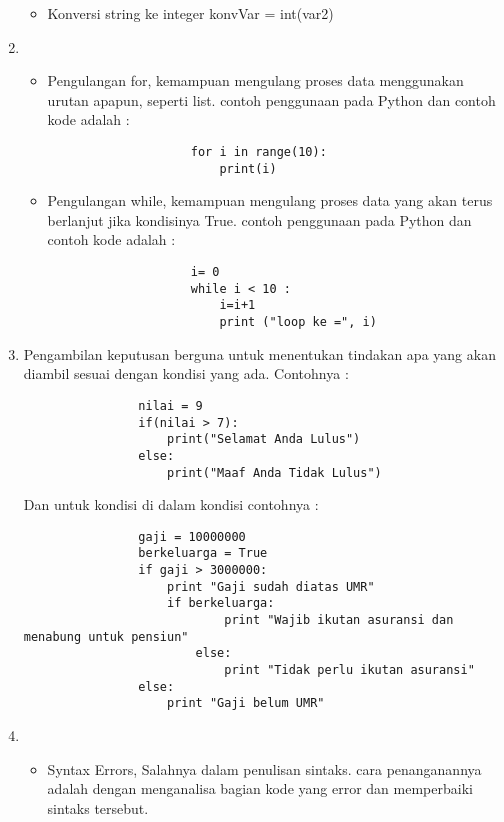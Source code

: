 \begin{enumerate}
\begin{itemize}
					\item Konversi string ke integer
					konvVar = int(var2)
				\end{itemize}

			\item \begin{itemize}
				\item Pengulangan for, kemampuan mengulang proses data menggunakan urutan apapun, seperti list.
				contoh penggunaan pada Python dan contoh kode adalah :

					\begin{verbatim}
					for i in range(10):
						print(i)
					\end{verbatim}
					
				\item Pengulangan while, kemampuan mengulang proses data yang akan terus berlanjut jika kondisinya True.
				contoh penggunaan pada Python dan contoh kode adalah :
					\begin{verbatim}
					i= 0
					while i < 10 :
						i=i+1
						print ("loop ke =", i)
					\end{verbatim}
				\end{itemize}
				
			\item Pengambilan keputusan berguna untuk menentukan tindakan apa yang akan diambil sesuai dengan kondisi yang ada. Contohnya :
				\begin{verbatim}
				nilai = 9
				if(nilai > 7):
					print("Selamat Anda Lulus")
				else:
					print("Maaf Anda Tidak Lulus")
				\end{verbatim}
				
				Dan untuk kondisi di dalam kondisi contohnya :
				
				\begin{verbatim}
				gaji = 10000000
				berkeluarga = True
				if gaji > 3000000:
					print "Gaji sudah diatas UMR"
					if berkeluarga:
							print "Wajib ikutan asuransi dan menabung untuk pensiun"
						else:
							print "Tidak perlu ikutan asuransi"
				else:
					print "Gaji belum UMR"
				\end{verbatim}

			\item \begin{itemize}
					\item Syntax Errors, Salahnya dalam penulisan sintaks.
					cara penanganannya adalah dengan menganalisa bagian kode yang error dan memperbaiki sintaks tersebut.
					

\end{itemize}
\end{enumerate}
